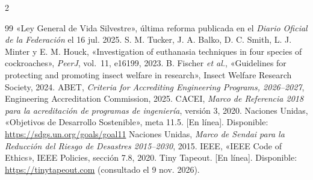 \begin{multicols}{2}
\begin{thebibliography}{99}
 «Ley General de Vida Silvestre», última reforma publicada en el \textit{Diario Oficial de la Federación} el 16 jul. 2025.
 S. M. Tucker, J. A. Balko, D. C. Smith, L. J. Minter y E. M. Houck, «Investigation of euthanasia techniques in four species of cockroaches», \textit{PeerJ}, vol.~11, e16199, 2023.
 B. Fischer \textit{et al.}, «Guidelines for protecting and promoting insect welfare in research», Insect Welfare Research Society, 2024.
 ABET, \textit{Criteria for Accrediting Engineering Programs, 2026--2027}, Engineering Accreditation Commission, 2025.
 CACEI, \textit{Marco de Referencia 2018 para la acreditación de programas de ingeniería}, versión 3, 2020.
 Naciones Unidas, «Objetivos de Desarrollo Sostenible», meta 11.5. [En línea]. Disponible: \url{https://sdgs.un.org/goals/goal11}
 Naciones Unidas, \textit{Marco de Sendai para la Reducción del Riesgo de Desastres 2015--2030}, 2015.
 IEEE, «IEEE Code of Ethics», IEEE Policies, sección 7.8, 2020.
 Tiny Tapeout. [En línea]. Disponible: \url{https://tinytapeout.com} (consultado el 9 nov. 2026).

\end{thebibliography}
\end{multicols}
\endgroup
